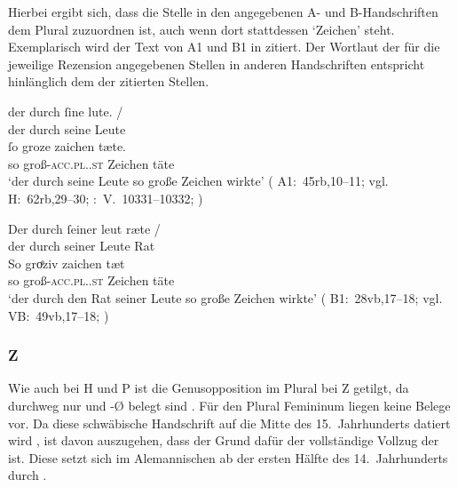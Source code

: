 Hierbei ergibt sich, dass die Stelle in den angegebenen A- und B-Handschriften
dem Plural zuzuordnen ist, auch wenn dort stattdessen  `Zeichen'
steht. Exemplarisch wird der Text von A1 und B1 in 
zitiert. Der Wortlaut der für die jeweilige Rezension angegebenen Stellen in
anderen Handschriften entspricht hinlänglich dem der zitierten Stellen.

\begin{exe}
\ex \label{ex:groziuwunder}
	\begin{xlist}
	\ex \label{ex:groziuwunder_1}
		\gll der durch ſine lute. {/} \\
			der durch seine Leute \\
		\gll ſo groze zaichen tæte. \\
			so groß-\textsc{acc.pl.\NeutI.st} Zeichen täte \\
		\trans `der durch seine Leute so große Zeichen wirkte'
			(%
				A1:~45rb,10--11; vgl.~%
				H:~62rb,29--30;
				\KC:~V.~10331--10332;
				\cite[271]{schroeder1895}%
			)

	\ex \label{ex:groziuwunder_2}
		\gll Der durch ſeiner leut ræte {/} \\
			der durch seiner Leute Rat \\
		\gll So groͤziv zaichen tæt \\
			so groß-\textsc{acc.pl.\NeutI.st} Zeichen täte \\
		\trans `der durch den Rat seiner Leute so große Zeichen wirkte'
			(%
				B1:~28vb,17--18; vgl.~%
				VB:~49vb,17--18;
				\cite[271]{schroeder1895}%
			)
	\end{xlist}
\end{exe}

\subsubsection{Z}
Wie auch bei H und P ist die Genusopposition im Plural bei Z getilgt, da
durchweg nur  und -Ø belegt sind . Für den Plural
Femininum liegen keine Belege vor. Da diese schwäbische
Handschrift auf die Mitte des 15.~Jahrhunderts datiert wird
\autocite[32]{wolf:kckat}, ist davon auszugehen, dass der Grund dafür der
vollständige Vollzug der  ist. Diese setzt sich im
Alemannischen ab der ersten Hälfte des 14.~Jahrhunderts durch
\autocites(Schwäbisch wird nicht gesondert ausgewiesen)[vgl.][267, Abbildung
A~69]{ksw2}.

